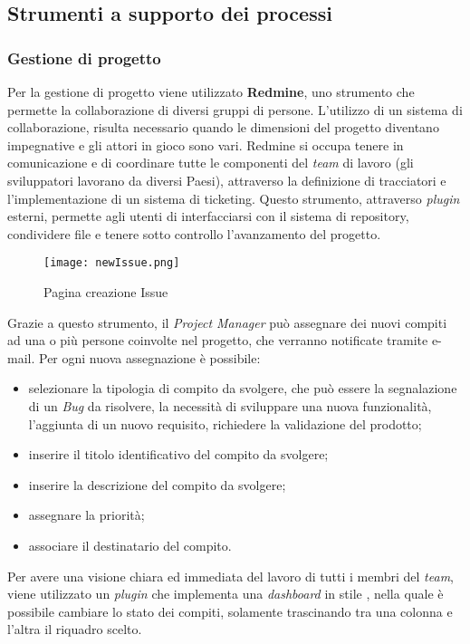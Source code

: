  
\subsection{Strumenti a supporto dei processi}
\subsubsection*{Gestione di progetto}

Per la gestione di progetto viene utilizzato \textbf{Redmine}, uno strumento che permette la collaborazione di diversi gruppi di persone. L'utilizzo di un sistema di collaborazione, risulta necessario quando le dimensioni del progetto diventano impegnative e gli attori in gioco sono vari. Redmine si occupa tenere in comunicazione e di coordinare tutte le componenti del \textit{team} di lavoro (gli sviluppatori lavorano da diversi Paesi), attraverso la definizione di tracciatori e l'implementazione di un sistema di ticketing.
Questo strumento, attraverso \textit{plugin} esterni, permette agli utenti di interfacciarsi con il sistema di repository, condividere file e tenere sotto controllo l'avanzamento del progetto.

\begin{figure}[H]
  \centering
  \texttt{[image: newIssue.png]}
  \caption{Pagina creazione Issue}
\end{figure}

Grazie a questo strumento, il \textit{Project Manager} può assegnare dei nuovi compiti ad una o più persone coinvolte nel progetto, che verranno notificate tramite e-mail.
Per ogni nuova assegnazione è possibile:
\begin{itemize}
\item selezionare la tipologia di compito da svolgere, che può essere la segnalazione di un \textit{Bug} da risolvere, la necessità di sviluppare una nuova funzionalità, l'aggiunta di un nuovo requisito, richiedere la validazione del prodotto;
\item inserire il titolo identificativo del compito da svolgere;
\item inserire la descrizione del compito da svolgere;
\item assegnare la priorità;
\item associare il destinatario del compito.
\end{itemize}

Per avere una visione chiara ed immediata del lavoro di tutti i membri del \textit{team}, viene utilizzato un \textit{plugin} che implementa una \textit{dashboard} in stile \textit{}, nella quale è possibile cambiare lo stato dei compiti, solamente trascinando tra una colonna e l'altra il riquadro scelto.

